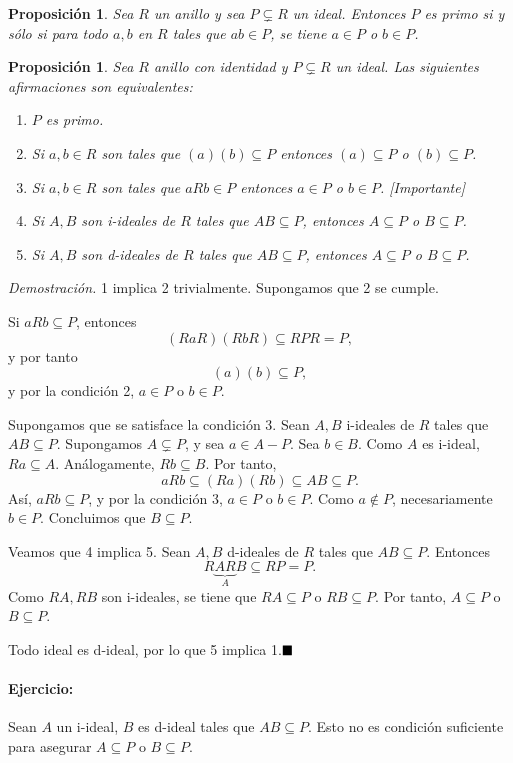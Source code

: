 \documentclass[11pt]{book}
\def\qed{\hfill\blacksquare}
\newtheorem{prop}[theorem]{Proposición}
\theoremstyle{definition}
\begin{document}
\begin{prop}
    Sea $R$ un anillo y sea $P\subsetneq R$ un ideal. Entonces $P$ es primo si y sólo si para todo $a,b$ en $R$ tales que $ab\in P$, se tiene $a\in P$ o $b\in P$.
\end{prop}

\begin{prop}
    Sea $R$ anillo con identidad y $P\subsetneq R$ un ideal. Las siguientes afirmaciones son equivalentes:\begin{enumerate}
        \item $P$ es primo.
        \item Si $a,b\in R$ son tales que $(a)(b)\subseteq P$ entonces $(a)\subseteq P$ o $(b)\subseteq P$.
        \item Si $a,b\in R$ son tales que $aRb\in P$ entonces $a\in P$ o $b\in P$. [Importante]
        \item Si $A,B$ son i-ideales de $R$ tales que $AB\subseteq P$, entonces $A\subseteq P$ o $B\subseteq P$.
        \item Si $A,B$ son d-ideales de $R$ tales que $AB\subseteq P$, entonces $A\subseteq P$ o $B\subseteq P$.
    \end{enumerate}
\end{prop}
\noindent\textit{Demostración.} 1 implica 2 trivialmente. Supongamos que 2 se cumple.

Si $aRb\subseteq P$, entonces\[
(RaR)(RbR)\subseteq RPR=P,
\]y por tanto\[
(a)(b)\subseteq P,
\]y por la condición 2, $a\in P$ o $b\in P$.

Supongamos que se satisface la condición 3. Sean $A,B$ i-ideales de $R$ tales que $AB\subseteq P$. Supongamos $A\subsetneq P$, y sea $a\in A-P$. Sea $b\in B$. Como $A$ es i-ideal, $Ra\subseteq A$. Análogamente, $Rb\subseteq B$. Por tanto,\[
aRb\subseteq (Ra)(Rb)\subseteq AB\subseteq P.
\]Así, $aRb\subseteq P$, y por la condición 3, $a\in P$ o $b\in P$. Como $a\notin P$, necesariamente $b\in P$. Concluimos que $B\subseteq P$.

Veamos que 4 implica 5. Sean $A,B$ d-ideales de $R$ tales que $AB\subseteq P$. Entonces\[
R\underbrace{AR}_AB\subseteq RP=P.
\]Como $RA,RB$ son i-ideales, se tiene que $RA\subseteq P$ o $RB\subseteq P$. Por tanto, $A\subseteq P$ o $B\subseteq P$.

Todo ideal es d-ideal, por lo que 5 implica 1.$\qed$

\paragraph{Ejercicio:} Sean $A$ un i-ideal, $B$ es d-ideal tales que $AB\subseteq P$. Esto no es condición suficiente para asegurar $A\subseteq P$ o $B\subseteq P$.
\end{document}
